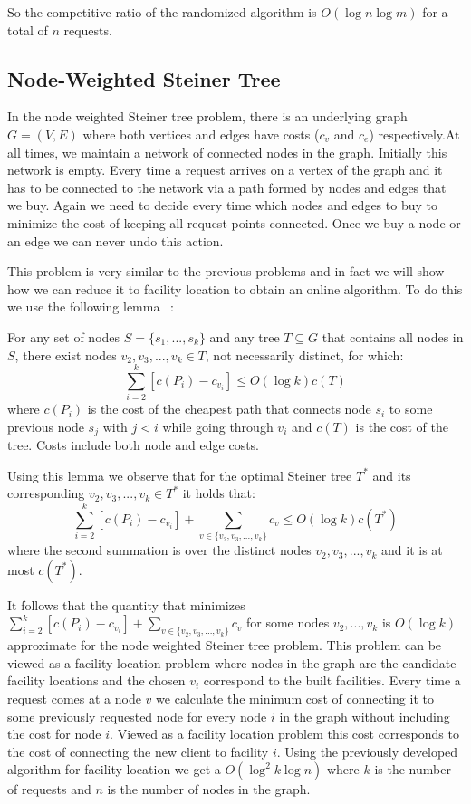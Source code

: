 So the competitive ratio of the randomized algorithm is $O(\log n \log m)$ for a total of $n$ requests.

\subsection{Node-Weighted Steiner Tree}

In the node weighted Steiner tree problem, there is an underlying graph $G=(V,E)$ where both vertices and edges have costs ($c_v$ and $c_e$) respectively.At all times, we maintain a network of connected nodes in the graph. Initially this network is empty. Every time a request arrives on a vertex of the graph and it has to be connected to the network via a path formed by nodes and edges that we buy. Again we need to decide every time which nodes and edges to buy to minimize the cost of keeping all request points connected. Once we buy a node or an edge we can never undo this action.

This problem is very similar to the previous problems and in fact we will show how we can reduce it to facility location to obtain an online algorithm. To do this we use the following lemma ~\cite{naor11:node-weighted-steiner-tree}:

\begin{lemma}
For any set of nodes $S = \{s_1,...,s_k\}$ and any tree $T \subseteq G$ that contains all nodes in $S$, 
there exist nodes $v_2, v_3, ... , v_k \in T$, not necessarily distinct, for which:
\[ \sum_{i=2}^k [c(P_i) - c_{v_i}] \le O(\log k) c(T) \]
where $c(P_i)$ is the cost of the cheapest path that connects node $s_i$ to some previous node $s_j$ with $j<i$ while going through $v_i$ and $c(T)$ is the cost of the tree. Costs include both node and edge costs.
\end{lemma}

Using this lemma we observe that for the optimal Steiner tree $T^*$ and its corresponding $v_2, v_3, ... , v_k \in T^*$ it holds that:
\[ \sum_{i=2}^k [c(P_i) - c_{v_i}] + \sum_{v \in \{v_2, v_3, ... , v_k\}} c_{v} \le O(\log k) c(T^*) \]
where the second summation is over the distinct nodes $v_2, v_3, ... , v_k$ and it is at most $c(T^*)$.

It follows that the quantity that minimizes $\sum_{i=2}^k [c(P_i) - c_{v_i}] + \sum_{v \in \{v_2, v_3, ... , v_k\}} c_{v}$ for some nodes $v_2,...,v_k$ is $O(\log k)$ approximate for the node weighted Steiner tree problem. This problem can be viewed as a facility location problem where nodes in the graph are the candidate facility locations and the chosen $v_i$ correspond to the built facilities. Every time a request comes at a node $v$ we calculate the minimum cost of connecting it to some previously requested node for every node $i$ in the graph without including the cost for node $i$. Viewed as a facility location problem this cost corresponds to the cost of connecting the new client to facility $i$. Using the previously developed algorithm for facility location we get a $O(\log^2 k \log n)$ where $k$ is the number of requests and $n$ is the number of nodes in the graph. 

